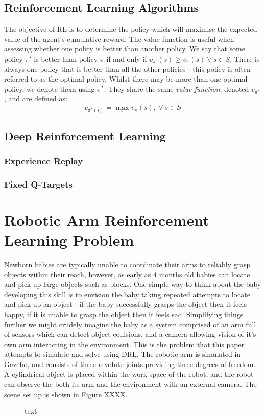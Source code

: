 \documentclass[a4paper]{article}
\begin{document}
\subsection{Reinforcement Learning Algorithms}
The objective of RL is to determine the policy which will maximise the expected value of the agent's cumulative reward. The value function is useful when assessing whether one policy is better than another policy. We say that some policy $\pi'$ is better than policy $\pi$ if and only if $v_{\pi'}(s) \geq v_{\pi}(s) \ \forall \ s \in S$. There is always one policy that is better than all the other policies - this policy is often referred to as the optimal policy. Whilst there may be more than one optimal policy, we denote them using $\pi^*$. They share the same \textit{value function}, denoted $v_{\pi^*}$, and are defined as:
\begin{equation}
v_{\pi^*(s)} = \max_{\pi} v_{\pi}(s), \ \forall \ s \in S
\end{equation}

\subsection{Deep Reinforcement Learning}
\subsubsection{Experience Replay}
\subsubsection{Fixed Q-Targets}



\section{Robotic Arm Reinforcement Learning Problem}
Newborn babies are typically unable to coordinate their arms to reliably grasp objects within their reach, however, as early as 4 months old babies can locate and pick up large objects such as blocks. One simple way to think about the baby developing this skill is to envision the baby taking repeated attempts to locate and pick up an object - if the baby successfully grasps the object then it feels happy, if it is unable to grasp the object then it feels sad. Simplifying things further we might crudely imagine the baby as a system comprised of an arm full of sensors which can detect object collisions, and a camera allowing vision of it's own arm interacting in the environment. This is the problem that this paper attempts to simulate and solve using DRL. The robotic arm is simulated in Gazebo, and consists of three revolute joints providing three degrees of freedom. A cylindrical object is placed within the work space of the robot, and the robot can observe the both its arm and the environment with an external camera. The scene set up is shown in Figure XXXX.
\begin{figure}[h]
\centering
\caption{text}
\end{figure}
\end{document}
